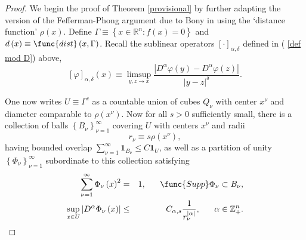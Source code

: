 \documentclass{amsart}
\theoremstyle{plain}
\numberwithin{equation}{section}
\begin{document}
\begin{proof}
We begin the proof of Theorem \ref{provisional} by further adapting the
version of the Fefferman-Phong argument due to Bony in \cite[Th\'{e}or\`{e}%
me 2]{Bon} using the `distance function' $\rho \left( x\right) $. Define $%
\Gamma \equiv \left\{ x\in \mathbb{R}^{n}:f\left( x\right) =0\right\} $ and $%
d\left( x\right) \equiv \func{dist}\left( x,\Gamma \right) $. Recall the
sublinear operators $\left[ \cdot \right] _{\alpha ,\delta }$ defined in (%
\ref{def mod D}) above,%
\begin{equation*}
\left[ \varphi \right] _{\alpha ,\delta }\left( x\right) \equiv
\limsup_{y,z\rightarrow x}\frac{\left\vert D^{\alpha }\varphi \left(
y\right) -D^{\alpha }\varphi \left( z\right) \right\vert }{\left\vert
y-z\right\vert ^{\delta }}.
\end{equation*}

One now writes $U\equiv \Gamma ^{c}$ as a countable union of cubes $Q_{\nu }$
with center $x^{\nu }$ and diameter comparable to $\rho \left( x^{\nu
}\right) $. Now for all $s>0$ sufficiently small, there is a collection of
balls $\left\{ B_{\nu }\right\} _{\nu =1}^{\infty }$ covering $U$ with
centers $x^{\nu }$ and radii 
\begin{equation*}
r_{\nu }\equiv s\rho \left( x^{\nu }\right) ,
\end{equation*}%
having bounded overlap $\sum_{\nu =1}^{\infty }\mathbf{1}_{B_{\nu }}\leq C%
\mathbf{1}_{U}$, as well as a partition of unity $\left\{ \Phi _{\nu
}\right\} _{\nu =1}^{\infty }$ subordinate to this collection satisfying%
\begin{eqnarray*}
\sum_{\nu =1}^{\infty }\Phi _{\nu }\left( x\right) ^{2} &=&1,\ \ \ \ \ \func{%
Supp}\Phi _{\nu }\subset B_{\nu }, \\
\sup_{x\in U}\left\vert D^{\alpha }\Phi _{\nu }\left( x\right) \right\vert
&\leq &C_{\alpha ,s}\frac{1}{r_{\nu }^{\left\vert \alpha \right\vert }},\ \
\ \ \ \alpha \in \mathbb{Z}_{+}^{n}.
\end{eqnarray*}


\end{proof}
\end{document}
